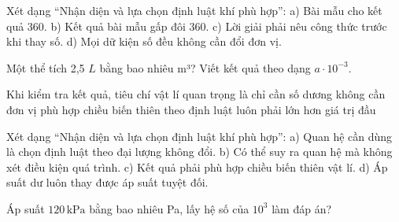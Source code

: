 \begin{ex}
Xét dạng “Nhận diện và lựa chọn định luật khí phù hợp”: a) Bài mẫu cho kết quả 360. b) Kết quả bài mẫu gấp đôi 360. c) Lời giải phải nêu công thức trước khi thay số. d) Mọi dữ kiện số đều không cần đổi đơn vị.
\choiceTF

\end{ex}

\begin{ex}
Một thể tích 2,5 $L$ bằng bao nhiêu m³? Viết kết quả theo dạng $a\cdot10^{-3}$.
\end{ex}

\begin{ex}
Khi kiểm tra kết quả, tiêu chí vật lí quan trọng là
\choice
{chỉ cần số dương}
{không cần đơn vị}
{\True phù hợp chiều biến thiên theo định luật}
{luôn phải lớn hơn giá trị đầu}
\end{ex}

\begin{ex}
Xét dạng “Nhận diện và lựa chọn định luật khí phù hợp”: a) Quan hệ cần dùng là chọn định luật theo đại lượng không đổi. b) Có thể suy ra quan hệ mà không xét điều kiện quá trình. c) Kết quả phải phù hợp chiều biến thiên vật lí. d) Áp suất dư luôn thay được áp suất tuyệt đối.
\choiceTF

\end{ex}

\begin{ex}
Áp suất $120\,\text{kPa}$ bằng bao nhiêu Pa, lấy hệ số của $10^3$ làm đáp án?
\end{ex}

